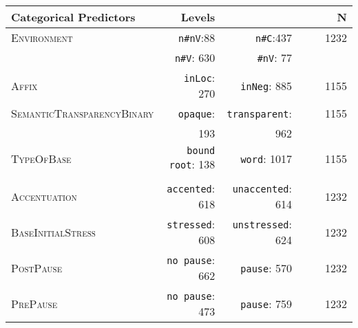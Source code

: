 \begin{table}[H]
\begin{center}
{\begin{tabular}{lrrrrr}
				\hline
				\textbf{Categorical Predictors }& Levels &   &  & &N  \\ 
				\hline
				\textsc{Environment}       & \texttt{n\#nV}:88  &   \texttt{n\#C}:437   & && 1232\\ 
				& \texttt{n\#V}: 630  & \texttt{\#nV}: 77  &&& \\ 		
				\textsc{Affix}        &\texttt{inLoc}: 270 & \texttt{inNeg}: 885 & &&1155 \\ 	
				\textsc{SemanticTransparencyBinary}        & \texttt{opaque}: & \texttt{transparent}: && & 1155\\ 
				& 193& 962&& & \\ 
				\textsc{TypeOfBase}        &\texttt{ bound root}: 138& \texttt{ word}: 1017& &&  1155\\ 	
				&& & && \\ 			
				\textsc{Accentuation}       &\texttt{accented}: 618 & \texttt{unaccented}: 614 & && 1232 \\ 
				\textsc{BaseInitialStress}       &\texttt{stressed}: 608 & \texttt{unstressed}: 624 & & & 1232\\ 		
				\textsc{PostPause}       &\texttt{no pause}: 662 & \texttt{pause}: 570 & && 1232 \\ 
				\textsc{PrePause}       &\texttt{no pause}: 473 & \texttt{pause}: 759 & & & 1232\\ 
				\hline
			\end{tabular}
		}
	\end{center}

\end{table}



